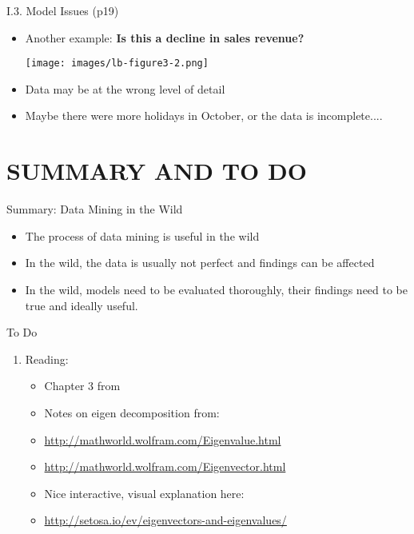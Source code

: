 \documentclass[handout]{beamer}
\newcommand{\strong}[1]{\textbf{\color{teal} #1}}
\begin{document}
\begin{frame}{I.3. Model Issues (p19)}
\begin{itemize}
\item Another example: \strong{Is this a decline in sales revenue?}
\begin{center}
\texttt{[image: images/lb-figure3-2.png]}\\
\cite[Figure 3.2]{LB3:2011}
\end{center}
\item Data may be at the wrong level of detail
\item Maybe there were more holidays in October, or the data is incomplete....
\end{itemize}
\end{frame}



\section*{SUMMARY AND TO DO}
\begin{frame}{Summary: Data Mining in the Wild}
\begin{itemize}
\item The process of data mining is useful in the wild
\item In the wild, the data is usually not perfect and findings can be affected
\item In the wild, models need to be evaluated thoroughly, their findings need to be true and ideally useful.
\end{itemize}
\end{frame}
\begin{frame}{To Do}
\begin{enumerate}
\item Reading:
	\begin{itemize}
	\item Chapter 3 from \cite{LB3:2011}
	\item Notes on eigen decomposition from:
	\item[] \url{http://mathworld.wolfram.com/Eigenvalue.html}
	\item[] \url{http://mathworld.wolfram.com/Eigenvector.html}
	\item Nice interactive, visual explanation here:
	\item[] \url{http://setosa.io/ev/eigenvectors-and-eigenvalues/}
	\end{itemize}
\end{enumerate}
\end{frame}
\end{document}
